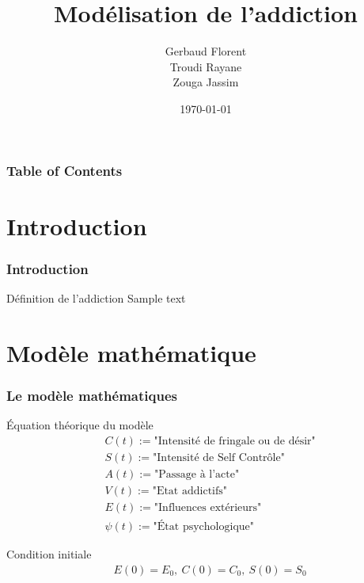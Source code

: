 \documentclass{beamer}
\title{Modélisation de l'addiction}
\author{Gerbaud Florent\\ Troudi Rayane \\Zouga Jassim}
\institute{Polyteh Nice}
\date{\today}
\begin{document}
	
	\frame{\titlepage}
	
	\begin{frame}
		\frametitle{Table of Contents}
		\tableofcontents
	\end{frame}
	
	
	\section{Introduction}
	
	\begin{frame}
		\frametitle{Introduction}
		
		\begin{block}{Définition de l'addiction}
			Sample text
		\end{block}
	\end{frame}
	
	
\section{Modèle mathématique}

\begin{frame}
	\frametitle{Le modèle mathématiques}
	\begin{block}{Équation théorique du modèle}
		\begin{align*}
			&C(t) :=\text{"Intensité de fringale ou de désir"} \\
			&S(t):=\text{"Intensité de Self Contrôle"} \\
			&A(t):=\text{"Passage à l'acte"}\\
			&V(t):=\text{"Etat addictifs"} \\
			&E(t):=\text{"Influences extérieurs"}  \\
			&\psi(t):=\text{"État psychologique"}
		\end{align*}
	\end{block}
	\begin{block}{Condition initiale}
		\begin{align*}
			&E(0)=E_0, \ C(0)=C_0, \ S(0)=S_0
		\end{align*}
	\end{block}
\end{frame}
\end{document}
